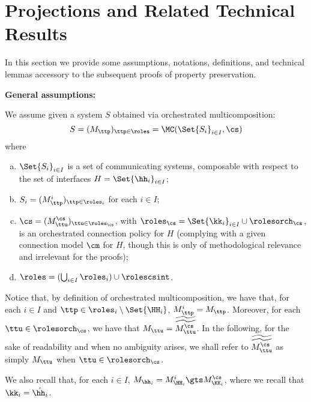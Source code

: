 
\section{Projections and Related Technical Results}
\label{sect:safetypreservation}


In this section we provide some assumptions, notations, definitions, and technical lemmas 
accessory to the subsequent proofs of property preservation.



\medskip

\noindent
\textbf{General assumptions:}

\noindent
We assume given a
system $S$  obtained via orchestrated multicomposition:
$$S= (M_\ttp)_{\ttp\in\roles} = \MC(\Set{S_i}_{i\in I}, \cs)$$
where 
\begin{enumerate}[a)]
\item
$\Set{S_i}_{i\in I}$
is a set of communicating systems, composable with respect to the set of interfaces
$H = \Set{\hh_i}_{i\in I}$;
\item 
$S_i= (M^i_\ttp)_{\ttp\in \roles_i}$ for each $i\in I$;
\item
$\cs = (M^{\cs}_\ttu)_{\ttu\in \roles_{\cs}}$, with $\roles_{\cs} = \Set{\kk_i}_{i\in I}\cup\rolesorch_{\cs}$, is an orchestrated connection policy for $H$ (complying with a given connection model
$\cm$ for $H$,  though this is only of methodological relevance and irrelevant for the proofs);
\item
$\roles = (\bigcup_{i\in I} \roles_i)\cup \rolescsint$.
\end{enumerate}
 Notice that, by definition of orchestrated multicomposition, we have that, for each $i\in I$ and $\ttp\in\roles_i\setminus\Set{\HH_i}$, $M^i_\ttp = M_\ttp$. 
 Moreover, for each $\ttu\in\rolesorch_{\cs}$, we have that $M_\ttu = \widetilde{\widetilde{M^{\cs}_\ttu}}$. In the following, for the sake of readability and when no
ambiguity arises, we shall refer to $\widetilde{\widetilde{M^{\cs}_\ttu}}$ as simply $M_\ttu$ when
$\ttu\in\rolesorch_{\cs}$.
 

 We also recall that, for each $i\in I$, $M_{\hh_i} = M^i_{\HH_i}\gts M^{\cs}_{\KK_i}$, where we recall that $\kk_i=\dot{\hh_i}$.



